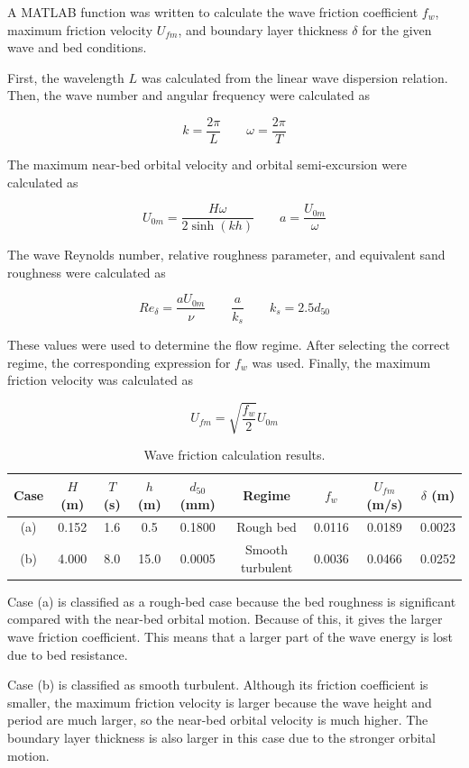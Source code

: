 \documentclass[a4paper]{article}
\begin{document}
\vspace{0.4cm}
A MATLAB function was written to calculate the wave friction coefficient $f_w$, maximum friction velocity $U_{fm}$, and boundary layer thickness $\delta$ for the given wave and bed conditions.

First, the wavelength $L$ was calculated from the linear wave dispersion relation. Then, the wave number and angular frequency were calculated as

\[
k = \frac{2\pi}{L}
\qquad
\omega = \frac{2\pi}{T}
\]

The maximum near-bed orbital velocity and orbital semi-excursion were calculated as

\[
U_{0m} = \frac{H\omega}{2\sinh(kh)}
\qquad
a = \frac{U_{0m}}{\omega}
\]

The wave Reynolds number, relative roughness parameter, and equivalent sand roughness were calculated as

\[
Re_{\delta} = \frac{aU_{0m}}{\nu}
\qquad
\frac{a}{k_s}
\qquad
k_s = 2.5d_{50}
\]

These values were used to determine the flow regime. After selecting the correct regime, the corresponding expression for $f_w$ was used. Finally, the maximum friction velocity was calculated as

\[
U_{fm} = \sqrt{\frac{f_w}{2}}U_{0m}
\]

\begin{table}[H]
\centering
\caption{\small Wave friction calculation results.}
\vspace{0.2cm}
\label{tab:q2results}
\begin{tabular}{c c c c c c c c c}
\hline
Case & $H$ (m) & $T$ (s) & $h$ (m) & $d_{50}$ (mm) & Regime & $f_w$ & $U_{fm}$ (m/s) & $\delta$ (m) \\
\hline
(a) & 0.152 & 1.6 & 0.5 & 0.1800 & Rough bed & 0.0116 & 0.0189 & 0.0023 \\
(b) & 4.000 & 8.0 & 15.0 & 0.0005 & Smooth turbulent & 0.0036 & 0.0466 & 0.0252 \\
\hline
\end{tabular}
\end{table}

Case (a) is classified as a rough-bed case because the bed roughness is significant compared with the near-bed orbital motion. Because of this, it gives the larger wave friction coefficient. This means that a larger part of the wave energy is lost due to bed resistance.

Case (b) is classified as smooth turbulent. Although its friction coefficient is smaller, the maximum friction velocity is larger because the wave height and period are much larger, so the near-bed orbital velocity is much higher. The boundary layer thickness is also larger in this case due to the stronger orbital motion.
\end{document}
